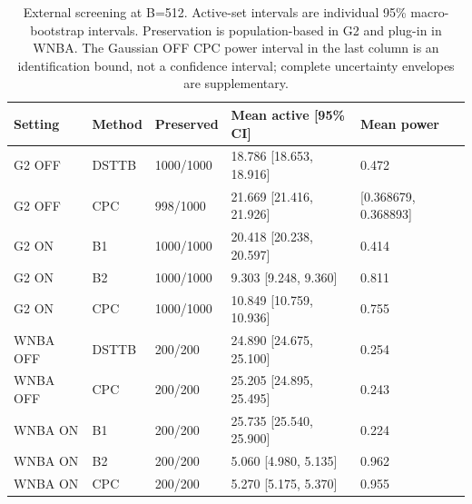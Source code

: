 \begin{table}[tbp]\centering\footnotesize
\caption{External screening at B=512. Active-set intervals are individual 95\% macro-bootstrap intervals. Preservation is population-based in G2 and plug-in in WNBA. The Gaussian OFF CPC power interval in the last column is an identification bound, not a confidence interval; complete uncertainty envelopes are supplementary.}\label{tab:external}
\begin{tabularx}{\linewidth}{lllXX}\toprule
Setting & Method & Preserved & Mean active [95\% CI] & Mean power \\ \midrule
G2 OFF & DSTTB & 1000/1000 & 18.786 [18.653, 18.916] & 0.472 \\
G2 OFF & CPC & 998/1000 & 21.669 [21.416, 21.926] & [0.368679, 0.368893] \\
G2 ON & B1 & 1000/1000 & 20.418 [20.238, 20.597] & 0.414 \\
G2 ON & B2 & 1000/1000 & 9.303 [9.248, 9.360] & 0.811 \\
G2 ON & CPC & 1000/1000 & 10.849 [10.759, 10.936] & 0.755 \\
WNBA OFF & DSTTB & 200/200 & 24.890 [24.675, 25.100] & 0.254 \\
WNBA OFF & CPC & 200/200 & 25.205 [24.895, 25.495] & 0.243 \\
WNBA ON & B1 & 200/200 & 25.735 [25.540, 25.900] & 0.224 \\
WNBA ON & B2 & 200/200 & 5.060 [4.980, 5.135] & 0.962 \\
WNBA ON & CPC & 200/200 & 5.270 [5.175, 5.370] & 0.955 \\
\bottomrule\end{tabularx}
\end{table}
